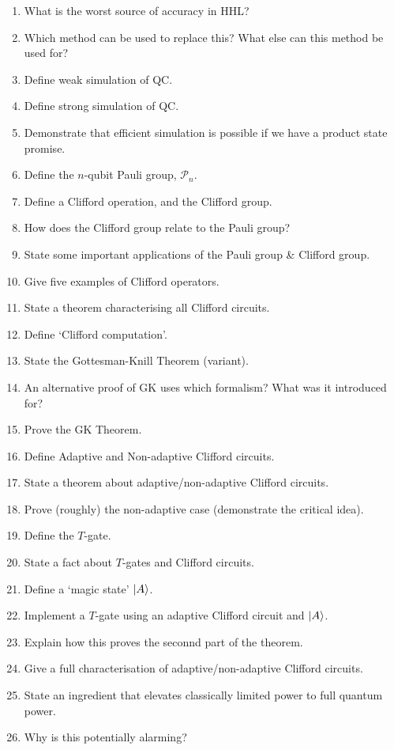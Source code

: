 \documentclass[]{article}
\begin{document}
\begin{enumerate}
    \item What is the worst source of accuracy in HHL?
    \item Which method can be used to replace this? What else can this method be used for?
    \item Define weak simulation of QC.
    \item Define strong simulation of QC.
    \item Demonstrate that efficient simulation is possible if we have a product state promise.
    \item Define the $n$-qubit Pauli group, $\mathcal{P}_n$.
    \item Define a Clifford operation, and the Clifford group.
    \item How does the Clifford group relate to the Pauli group?
    \item State some important applications of the Pauli group \& Clifford group.
    \item Give five examples of Clifford operators.
    \item State a theorem characterising all Clifford circuits.
    \item Define `Clifford computation'.
    \item State the Gottesman-Knill Theorem (variant).
    \item An alternative proof of GK uses which formalism? What was it introduced for?
    \item Prove the GK Theorem.
    \item Define Adaptive and Non-adaptive Clifford circuits.
    \item State a theorem about adaptive/non-adaptive Clifford circuits.
    \item Prove (roughly) the non-adaptive case (demonstrate the critical idea).
    \item Define the $T$-gate.
    \item State a fact about $T$-gates and Clifford circuits.
    \item Define a `magic state' $\lvert A\rangle$.
    \item Implement a $T$-gate using an adaptive Clifford circuit and $\lvert A\rangle$.
    \item Explain how this proves the seconnd part of the theorem.
    \item Give a full characterisation of adaptive/non-adaptive Clifford circuits.
    \item State an ingredient that elevates classically limited power to full quantum power.
    \item Why is this potentially alarming?
\end{enumerate}
\end{document}
